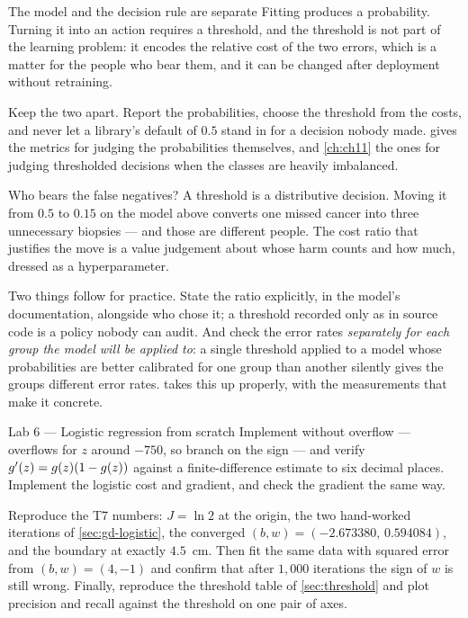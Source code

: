 \begin{keyinsight}{The model and the decision rule are separate}
Fitting produces a probability. Turning it into an action requires a threshold,
and the threshold is not part of the learning problem: it encodes the relative
cost of the two errors, which is a matter for the people who bear them, and it
can be changed after deployment without retraining.

Keep the two apart. Report the probabilities, choose the threshold from the
costs, and never let a library's default of $0.5$ stand in for a decision nobody
made.  gives the metrics for judging the probabilities themselves,
and \cref{ch:ch11} the ones for judging thresholded decisions when the classes
are heavily imbalanced.
\end{keyinsight}

\begin{ethicsnote}{Who bears the false negatives?}
A threshold is a distributive decision. Moving it from $0.5$ to $0.15$ on the
model above converts one missed cancer into three unnecessary biopsies --- and
those are different people. The cost ratio that justifies the move is a value
judgement about whose harm counts and how much, dressed as a hyperparameter.

Two things follow for practice. State the ratio explicitly, in the model's
documentation, alongside who chose it; a threshold recorded only as
 in source code is a policy nobody can audit. And check the error rates
\emph{separately for each group the model will be applied to}: a single threshold
applied to a model whose probabilities are better calibrated for one group than
another silently gives the groups different error rates.
 takes this up properly, with the measurements that make it
concrete.
\end{ethicsnote}

\begin{labbox}{Lab 6 --- Logistic regression from scratch}
Implement  without overflow ---  overflows for
$z$ around $-750$, so branch on the sign --- and verify
$g'(z) = g(z)(1-g(z))$ against a finite-difference estimate to six
decimal places. Implement the logistic cost and gradient, and check the gradient
the same way.

Reproduce the T7 numbers: $J = \ln 2$ at the origin, the two hand-worked
iterations of \cref{sec:gd-logistic}, the converged $(b,w) =
(-2.673380,\,0.594084)$, and the boundary at exactly $4.5$~cm. Then fit the same
data with squared error from $(b,w) = (4,-1)$ and confirm that after $1{,}000$
iterations the sign of $w$ is still wrong. Finally, reproduce the threshold table
of \cref{sec:threshold} and plot precision and recall against the threshold on
one pair of axes.
\end{labbox}

